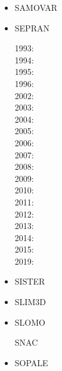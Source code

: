 \begin{itemize}
\item SAMOVAR
\cite{egat10}

\item SEPRAN

1993: \cite{beky93}\cite{vavy93}\\
1994: \cite{vlvv94}\cite{vayv94}\\
1995: \cite{vayv95}\\
1996: \cite{vayu96}\\
2002: \cite{civv02}\cite{vavv02}\\
2003: \cite{vavs03}\\
2004: \cite{vavv04}\cite{vavv04b}\cite{vavv04c}\\
2005: \cite{vavv05}\cite{sepr05}\\
2006: \cite{liva06a}\cite{liva06b}\\
2007: \cite{vant07}\cite{civv07}\cite{brva07a}\cite{brva07b}\\
2008: \cite{plva08}\cite{brhv08}\\
2009: \cite{vavl09}\\
2010: \cite{vahy10}\cite{syva10}\\
2011: \cite{vahs11}\\
2012: \cite{besy12}\cite{beva12}\cite{chgv12}\\
2013: \cite{ancv13}\\
2014: \cite{chsg14}\cite{mova14}\\
2015: \cite{vasy15}\\
2019: \cite{zhdv19}\cite{vayu19}

\item SISTER

\cite{olbm16}

\item SLIM3D

\cite{poso08}
\cite{qusp10}
\cite{brps12}
\cite{brps13}
\cite{brau13}
\cite{brun14}
\cite{hebr14}
\cite{kobf14}
\cite{clbq15}
\cite{brcr17}
\cite{basq18}

\item SLOMO
\cite{kaus05}

\index SNAC
\cite{chlg08}


\item SOPALE


\end{itemize}
